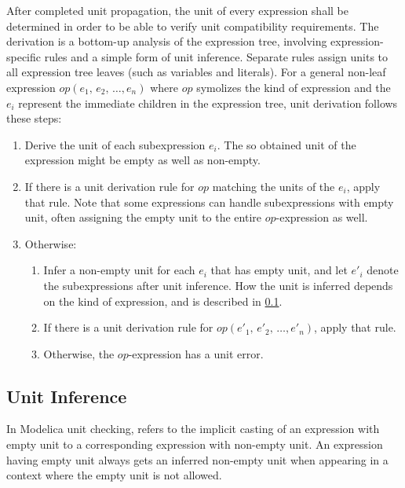 After completed unit propagation, the unit of every expression shall be determined in order to be able to verify unit compatibility requirements.
The derivation is a bottom-up analysis of the expression tree, involving expression-specific rules and a simple form of unit inference.
Separate rules assign units to all expression tree leaves (such as variables and literals).
For a general non-leaf expression $\mathit{op}(e_{1},\, e_{2},\, \ldots, e_{n})$ where $\mathit{op}$ symolizes the kind of expression and the $e_{i}$ represent the immediate children in the expression tree, unit derivation follows these steps:
\begin{enumerate}
\item
  Derive the unit of each subexpression $e_{i}$.
  The so obtained unit of the expression might be empty as well as non-empty.
\item
  If there is a unit derivation rule for $\mathit{op}$ matching the units of the $e_{i}$, apply that rule.
  Note that some expressions can handle subexpressions with empty unit, often assigning the empty unit to the entire $\mathit{op}$-expression as well.
\item
  Otherwise:
  \begin{enumerate}
  \def\labelenumii{\alph{enumii}.}
  \item
    Infer a non-empty unit for each $e_{i}$ that has empty unit, and let $e'_{i}$ denote the subexpressions after unit inference.
    How the unit is inferred depends on the kind of expression, and is described in \cref{unit-inference}.
  \item
    If there is a unit derivation rule for $\mathit{op}(e'_{1},\, e'_{2},\, \ldots, e'_{n})$, apply that rule.
  \item
    Otherwise, the $\mathit{op}$-expression has a unit error.
  \end{enumerate}
\end{enumerate}


\subsection{Unit Inference}\label{unit-inference}

In Modelica unit checking,  refers to the implicit casting of an expression with empty unit to a corresponding expression with non-empty unit.
An expression having empty unit always gets an inferred non-empty unit when appearing in a context where the empty unit is not allowed.

